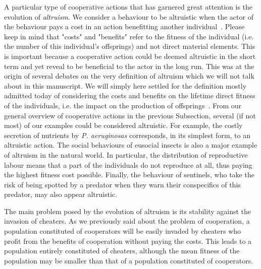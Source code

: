     A particular type of cooperative actions that has garnered great attention is the evolution of \emph{altruism}. We consider a behaviour to be altruistic when the actor of the behaviour pays a cost in an action benefitting another individual~\parencite{Hamilton1964, West2007a}. Please keep in mind that "costs" and "benefits" refer to the fitness of the individual (i.e. the number of this individual's offsprings) and not direct material elements. This is important because a cooperative action could be deemed altruistic in the short term and yet reveal to be beneficial to the actor in the long run. This was at the origin of several debates on the very definition of altruism which we will not talk about in this manuscript. We will simply here settled for the definition mostly admitted today of considering the costs and benefits on the lifetime direct fitness of the individuals, i.e. the impact on the production of offsprings~\parencite{West2007a, Lehmann2006}. From our general overview of cooperative actions in the previous Subsection, several (if not most) of our examples could be considered altruistic. For example, the costly secretion of nutrients by \emph{P. aeruginosas} corresponds, in its simplest form, to an altruistic action. The social behaviours of eusocial insects is also a major example of altruism in the natural world. In particular, the distribution of reproductive labour means that a part of the individuals do not reproduce at all, thus paying the highest fitness cost possible. Finally, the behaviour of sentinels, who take the risk of being spotted by a predator when they warn their conspecifics of this predator, may also appear altruistic.


    The main problem posed by the evolution of altruism is its stability against the invasion of cheaters. As we previously said about the problem of cooperation, a population constituted of cooperators will be easily invaded by cheaters who profit from the benefits of cooperation without paying the costs. This leads to a population entirely constituted of cheaters, although the mean fitness of the population may be smaller than that of a population constituted of cooperators.

